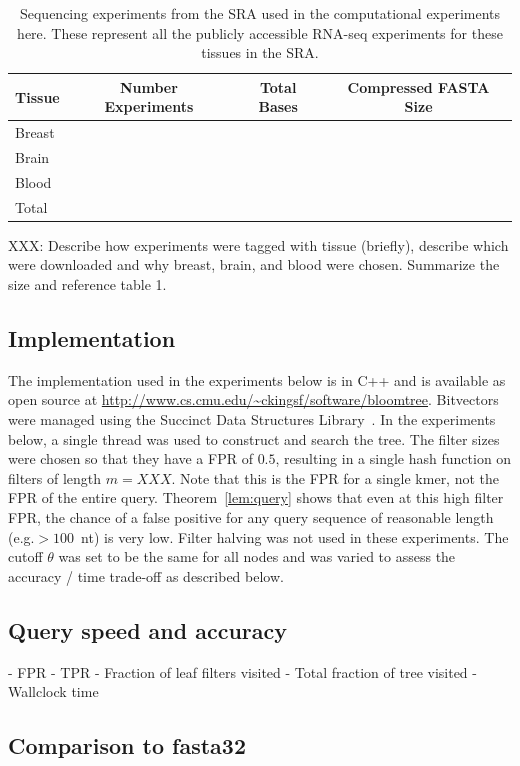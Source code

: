 \documentclass[11pt]{article}
\begin{document}
\begin{table}
\centering
\begin{tabular}{lccc}
\toprule
Tissue & Number Experiments & Total Bases & Compressed FASTA Size \\
\midrule
Breast & \\
Brain & \\
Blood & \\
\midrule
Total & \\
\bottomrule
\end{tabular}
\caption{Sequencing experiments from the SRA used in the computational experiments here. These represent all the publicly accessible RNA-seq experiments for these tissues in the SRA.}
\end{table}

XXX: Describe how experiments were tagged with tissue (briefly), describe which were downloaded and why breast, brain, and blood were chosen. Summarize the size and reference table 1.

\subsection{Implementation}

The implementation used in the experiments below is in C++ and is available as open source at \url{http://www.cs.cmu.edu/~ckingsf/software/bloomtree}. Bitvectors were managed using the Succinct Data Structures Library~\cite{sdsl}. In the experiments below, a single thread was used to construct and search the tree. The filter sizes were chosen so that they have a FPR of $0.5$, resulting in a single hash function on filters of length $m=XXX$. Note that this is the FPR for a single kmer, not the FPR of the entire query. Theorem~\ref{lem:query} shows that even at this high filter FPR, the chance of a false positive for any query sequence of reasonable length (e.g.\@ $> 100$~nt) is very low. Filter halving was not used in these experiments. The cutoff $\theta$ was set to be the same for all nodes and was varied to assess the accuracy / time trade-off as described below.

\subsection{Query speed and accuracy}

- FPR
- TPR
- Fraction of leaf filters visited 
- Total fraction of tree visited
- Wallclock time

\subsection{Comparison to fasta32}
\end{document}
